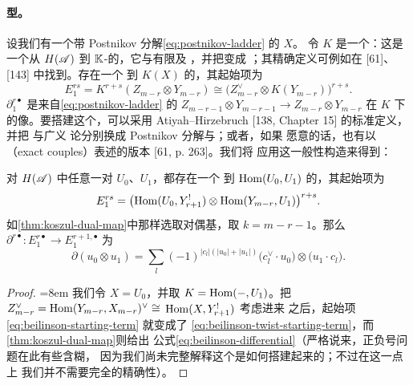 \paragraph{\trBeilinson{}型\trSpectralSequence。}\label{sub:beilinson-spectral-sequence}
设我们有一个带 Postnikov 分解\eqref{eq:postnikov-ladder} 的\trObject{} $X$。
令 $K$ 是一个\trCohomology\trFunctor：这是一个从 $H(\mathscr{A})$ 到\trGraded{}%
$\mathbb{K}$-\trVectorSpace{}的\trContravariant\trFunctor，它与有限\trDirectSum{}及%
\trSuspension{}\trCompatible，并把\trExactTriangle{}变成%
\trLongExactSequence；其精确定义可例如在 [61]、[143] 中找到。存在一个%
\trConvergence{}到 $K(X)$ 的\trSpectralSequence，其起始项为
\begin{equation}\label{eq:beilinson-starting-term}
E_1^{rs}=K^{r+s}(Z_{m-r}\otimes Y_{m-r})
\cong\bigl(Z^{\vee}_{m-r}\otimes K(Y_{m-r})\bigr)^{r+s}.
\end{equation}
\trDifferential{} $\partial_1^{r\bullet}$ 是来自\eqref{eq:postnikov-ladder}
的\trMorphism{} $Z_{m-r-1}\otimes Y_{m-r-1}\to Z_{m-r}\otimes Y_{m-r}$ 在 $K$
下的像。要搭建这个\trSpectralSequence，可以采用 Atiyah--Hirzebruch
\trSpectralSequence{} [138, Chapter 15] 的标准定义，并把%
\trCellularDecomposition{}与广义%
\trHomology{}论分别换成 Postnikov 分解与\trCohomology\trFunctor；或者，如果
愿意的话，也有以\textbf{\trExactCouple}（exact couples）表述的版本 [61, p. 263]。我们将
应用这一般性构造来得到：

\begin{proposition}\label{thm:beilinson-spectral-sequence}
对 $H(\mathscr{A})$ 中任意一对\trObject{} $U_0$、$U_1$，都存在一个\trConvergence{}%
到 $\operatorname{Hom}(U_0,U_1)$ 的\trSpectralSequence，其起始项为
\begin{equation}\label{eq:beilinson-twist-starting-term}
E_1^{rs}=\bigl(\operatorname{Hom}(U_0,Y^!_{r+1})\otimes\operatorname{Hom}(Y_{m-r},U_1)\bigr)^{r+s}.
\end{equation}
如\cref{thm:koszul-dual-map}中那样选取对偶基，取 $k=m-r-1$。那么%
\trDifferential{} $\partial^{r\bullet}\colon E_1^{r\bullet}\to
E_1^{r+1,\bullet}$ 为
\begin{equation}\label{eq:beilinson-differential}
\partial(u_0\otimes u_1)=\sum_l(-1)^{|c_l|(|u_0|+|u_1|)}
\bigl(c^{\vee}_l\cdot u_0\bigr)\otimes\bigl(u_1\cdot c_l\bigr).
\end{equation}
\end{proposition}

\begin{proof}
\begingroup\emergencystretch=8em
我们令 $X=U_0$，并取 $K=\operatorname{Hom}(-,U_1)$。把\trIsomorphism{}%
$Z^{\vee}_{m-r}=\operatorname{Hom}(Y_{m-r},X_{m-r})^{\vee}\cong$ $\operatorname{Hom}(X,Y^!_{r+1})$ 考虑进来
之后，起始项\eqref{eq:beilinson-starting-term} 就变成了
\eqref{eq:beilinson-twist-starting-term}，而\cref{thm:koszul-dual-map}则给出
公式\eqref{eq:beilinson-differential}（严格说来，正负号问题在此有些含糊，
因为我们尚未完整解释这个\trSpectralSequence{}是如何搭建起来的；不过在这一点上
我们并不需要完全的精确性）。
\par\endgroup
\end{proof}

